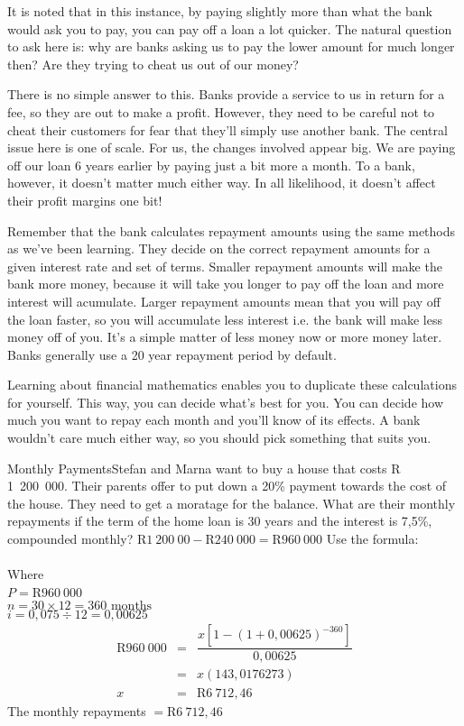 It is noted that in this instance, by paying slightly more than what the bank would ask you to pay, you can pay off a loan a lot quicker. The natural question to ask here is: why are banks asking us to pay the lower amount for much longer then? Are they trying to cheat us out of our money?

There is no simple answer to this. Banks provide a service to us in return for a fee, so they are out to make a profit. However, they need to be careful not to cheat their customers for fear that they'll simply use another bank. The central issue here is one of scale. For us, the changes involved appear big. We are paying off our loan 6 years earlier by paying just a bit more a month. To a bank, however, it doesn't matter much either way. In all likelihood, it doesn't affect their profit margins one bit!

Remember that the bank calculates repayment amounts using the same methods as we've been learning. They decide on the correct repayment amounts for a given interest rate and set of terms. Smaller repayment amounts will make the bank more money, because it will take you longer to pay off the loan and more interest will acumulate. Larger repayment amounts mean that you will pay off the loan faster, so you will accumulate less interest i.e. the bank will make less money off of you. It's a simple matter of less money now or more money later. Banks generally use a 20 year repayment period by default.

Learning about financial mathematics enables you to duplicate these calculations for yourself. This way, you can decide what's best for you. You can decide how much you want to repay each month and you'll know of its effects. A bank wouldn't care much either way, so you should pick something that suits you.

\begin{wex}{Monthly Payments}{Stefan and Marna want to buy a house that costs R 1~200~000. Their parents offer to put down a 20\% payment towards the cost of the house.  They need to get a moratage for the balance.  What are their monthly repayments if the term of the home loan is 30 years and the interest is 7,5\%, compounded monthly?}
{
R$ 1~200~00 - $R$ 240~000 = $R$ 960~000$
Use the formula: \\
\\
Where \\
$P = $R$960~000$\\
$n = 30 \times 12 = 360 \mbox{ months}$\\
$i = 0,075 \div 12 = 0,00625$
\begin{eqnarray*}
\mbox{R}960~000&=& \dfrac{x[1-(1 + 0,00625)^{-360}]}{0,00625}\\
&=&x(143,0176273)\\
x&=&\mbox{R} 6~712,46
\end{eqnarray*}
The monthly repayments $= $R$6~712,46$
}
\end{wex}

